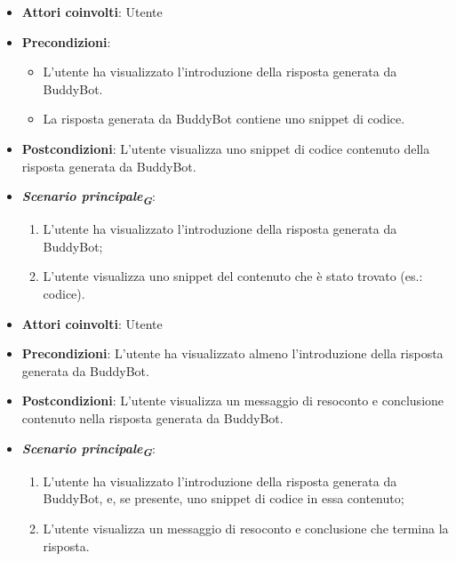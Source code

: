 
\begin{itemize}
    \item \textbf{Attori coinvolti}: Utente
    \item \textbf{Precondizioni}: 
    \begin{itemize}
        \item L'utente ha visualizzato l'introduzione della risposta generata da BuddyBot.
        \item La risposta generata da BuddyBot contiene uno snippet di codice.
    \end{itemize}
    \item \textbf{Postcondizioni}: L'utente visualizza uno snippet di codice contenuto della risposta generata da BuddyBot.
    \item \textbf{\emph{Scenario principale}\textsubscript{\textbf{\textit{G}}}}:
    \begin{enumerate}
        \item L'utente ha visualizzato l'introduzione della risposta generata da BuddyBot;
        \item L'utente visualizza uno snippet del contenuto che è stato trovato (es.: codice).
    \end{enumerate}
\end{itemize}




\begin{itemize}
    \item \textbf{Attori coinvolti}: Utente
    \item \textbf{Precondizioni}: L'utente ha visualizzato almeno l'introduzione della risposta generata da BuddyBot.
    \item \textbf{Postcondizioni}: L'utente visualizza un messaggio di resoconto e conclusione contenuto nella risposta generata da BuddyBot.
    \item \textbf{\emph{Scenario principale}\textsubscript{\textbf{\textit{G}}}}:
    \begin{enumerate}
        \item L'utente ha visualizzato l'introduzione della risposta generata da BuddyBot, e, se presente, uno snippet di codice in essa contenuto;
        \item L'utente visualizza un messaggio di resoconto e conclusione che termina la risposta.
    \end{enumerate}
\end{itemize}



